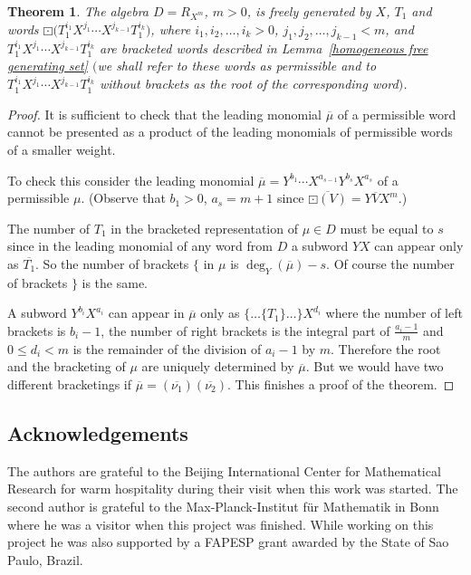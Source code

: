 \documentclass[pdftex]{sigma}
\numberwithin{equation}{section}
\newtheorem{Theorem}{Theorem}[section]
\begin{document}
\begin{Theorem}The algebra $D = R_{X^m}$, $m > 0$, is freely generated by $X$, $T_1$ and words $\boxdot\big(T_1^{i_1}X^{j_1} \cdots \allowbreak X^{j_{k-1}}T_1^{i_k}\big)$, where $i_1, i_2, \ldots,i_k > 0$, $j_1, j_2, \ldots, j_{k-1} < m$, and $T_1^{i_1}X^{j_1} \cdots X^{j_{k-1}}T_1^{i_k}$ are bracketed words described in Lemma~{\rm \ref{homogeneous free generating set}} $($we shall refer to these words as permissible and to $T_1^{i_1}X^{j_1} \cdots X^{j_{k-1}}T_1^{i_k}$ without brackets as the root of the corresponding word$)$.
\end{Theorem}

\begin{proof}It is sufficient to check that the leading monomial $\overline{\mu}$ of a permissible word cannot be presented as a product of the leading monomials of permissible words of a smaller weight.

To check this consider the leading monomial $\overline{\mu} = Y^{b_1} \cdots X^{a_{s-1}}Y^{b_s}X^{a_s}$ of a permissible $\mu$. (Observe that $b_1 > 0$, $a_s = m+1$ since $\overline{\boxdot(V)} =Y\overline{V}X^m$.)

The number of $T_1$ in the bracketed representation of $\mu \in D$ must be equal to $s$ since in the leading monomial of any word from $D$ a subword $YX$ can appear only as $\overline{T_1}$. So the number of brackets $\{$ in $\mu$ is $\deg_Y(\overline{\mu}) - s$. Of course the number of brackets $\}$ is the same.

A subword $Y^{b_i}X^{a_i}$ can appear in $\overline{\mu}$ only as $\{\ldots\{T_1\}\ldots\}X^{d_i}$ where the number of left brackets is $b_i - 1$, the number of right brackets is the integral part of $\frac{a_i - 1}{m}$ and $0 \leq d_i <m$ is the remainder of the division of $a_i - 1$ by $m$. Therefore the root and the bracketing of $\mu$ are uniquely determined by $\overline{\mu}$. But we would have two different bracketings if $\overline{\mu} = (\overline{\nu_1})(\overline{\nu_2})$. This finishes a proof of the theorem.
\end{proof}

\subsection*{Acknowledgements}

The authors are grateful to the Beijing International Center for Mathematical Research for warm hospitality during their visit when this work was started. The second author is grateful to the Max-Planck-Institut f\"ur Mathematik in Bonn where he was a visitor when this project was finished. While working on this project he was also supported by a FAPESP grant awarded by the State of Sao Paulo, Brazil.
\end{document}
